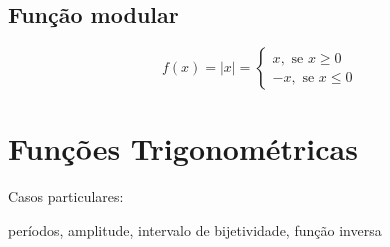   \subsection{Função modular}

  \[f(x)= |x| = \begin{cases}
                 x, \text{ se } x \geq 0 \\
                 -x, \text{ se } x \leq 0
                \end{cases}\]

  \section{Funções Trigonométricas}

  Casos particulares:

  {\color{red} períodos, amplitude, intervalo de bijetividade, função inversa}


